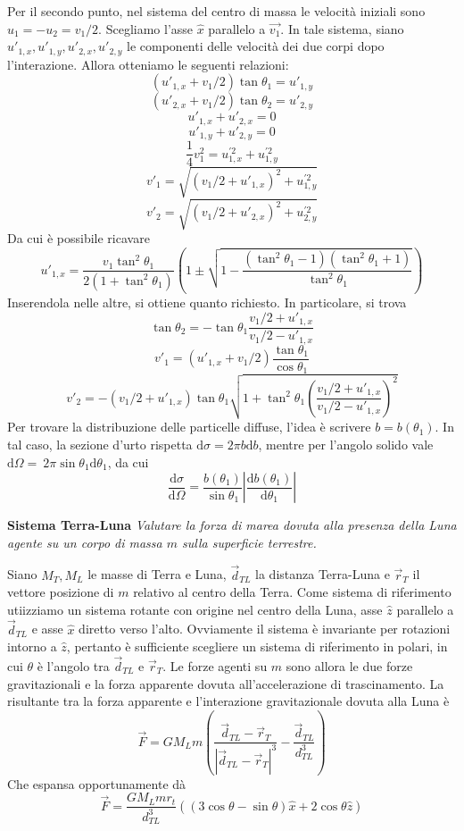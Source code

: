 \documentclass[a4paper,11pt]{article}
\begin{document}
\noindent Per il secondo punto, nel sistema del centro di massa le velocità iniziali sono $u_1=-u_2=v_1/2$. Scegliamo l'asse $\hat{x}$ parallelo a $\vec{v_1}$. In tale sistema, siano $u'_{1,x}, u'_{1,y},u'_{2,x},u'_{2,y}$ le componenti delle velocità dei due corpi dopo l'interazione. Allora otteniamo le seguenti relazioni:
$$(u'_{1,x}+v_1/2)\tan\theta_1=u'_{1,y}$$
$$(u'_{2,x}+v_1/2)\tan\theta_2=u'_{2,y}$$
$$u'_{1,x}+u'_{2,x}=0$$
$$u'_{1,y}+u'_{2,y}=0$$
$$\frac{1}{4}v_1^2=u_{1,x}^{'2}+u_{1,y}^{'2}$$
$$v'_1=\sqrt{(v_1/2+u'_{1,x})^2+u_{1,y}^{'2}}$$
$$v'_2=\sqrt{(v_1/2+u'_{2,x})^2+u_{2,y}^{'2}}$$
\noindent Da cui è possibile ricavare
$$u'_{1,x}=\frac{v_1\tan^2\theta_1}{2(1+\tan^2\theta_1)}\left(1\pm\sqrt{1-\frac{(\tan^2\theta_1-1)(\tan^2\theta_1+1)}{\tan^2\theta_1}}\right)$$
Inserendola nelle altre, si ottiene quanto richiesto. In particolare, si trova
$$\tan\theta_2=-\tan\theta_1\frac{v_1/2+u'_{1,x}}{v_1/2-u'_{1,x}}$$
$$v'_1=(u'_{1,x}+v_1/2)\frac{\tan\theta_1}{\cos\theta_1}$$
$$v'_2=-(v_1/2+u'_{1,x})\tan\theta_1\sqrt{1+\tan^2\theta_1\left(\frac{v_1/2+u'_{1,x}}{v_1/2-u'_{1,x}}\right)^2}$$
Per trovare la distribuzione delle particelle diffuse, l'idea è scrivere $b=b(\theta_1)$. In tal caso, la sezione d'urto rispetta $\mathrm{d}\sigma=2\pi b\mathrm{d}b$, mentre per l'angolo solido vale $\mathrm{d}\Omega=~2\pi\sin\theta_1\mathrm{d}\theta_1$, da cui
$$\frac{\mathrm{d}\sigma}{\mathrm{d}\Omega}=\frac{b(\theta_1)}{\sin\theta_1}\left|\frac{\mathrm{d}b(\theta_1)}{\mathrm{d}\theta_1}\right|$$
\vspace{5mm}

\noindent\textbf{Sistema Terra-Luna} \textit{Valutare la forza di marea dovuta alla presenza della Luna agente su un corpo di massa $m$ sulla superficie terrestre.}

\noindent Siano $M_T,M_L$ le masse di Terra e Luna, $\vec{d}_{TL}$ la distanza Terra-Luna e $\vec{r}_T$ il vettore posizione di $m$ relativo al centro della Terra. Come sistema di riferimento utiizziamo un sistema rotante con origine nel centro della Luna, asse $\hat{z}$ parallelo a $\vec{d}_{TL}$ e asse $\hat{x}$ diretto verso l'alto. Ovviamente il sistema è invariante per rotazioni intorno a $\hat{z}$, pertanto è sufficiente scegliere un sistema di riferimento in polari, in cui $\theta$ è l'angolo tra $\vec{d}_{TL}$ e $\vec{r}_T$. Le forze agenti su $m$ sono allora le due forze gravitazionali e la forza apparente dovuta all'accelerazione di trascinamento. La risultante tra la forza apparente e l'interazione gravitazionale dovuta alla Luna è
$$\vec{F}=GM_Lm\left(\frac{\vec{d}_{TL}-\vec{r}_T}{|\vec{d}_{TL}-\vec{r}_T|^3}-\frac{\vec{d}_{TL}}{d_{TL}^3}\right)$$
Che espansa opportunamente dà
$$\vec{F}=\frac{GM_Lmr_t}{d_{TL}^3}((3\cos\theta-\sin\theta)\hat{x}+2\cos\theta\hat{z})$$
\end{document}
